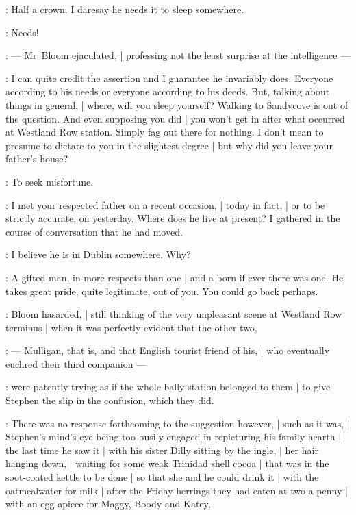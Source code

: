 \Stephen:
Half a crown.
I daresay he needs it to sleep somewhere.

\Bloom:
Needs!

:
    --- Mr~Bloom ejaculated, |
        professing not the least surprise at the intelligence ---

\Bloom:
I can quite credit the assertion and I guarantee he invariably does.
Everyone according to his needs or everyone according to his deeds.
But, talking about things in general, |
where,
will you sleep yourself?
Walking to Sandycove is out of the question.
And even supposing you did |
you won't get in after what occurred at Westland Row station.
Simply fag out there for nothing.
I don't mean to presume to dictate to you in the slightest degree |
but why did you leave your father's house?

\Stephen:
To seek misfortune.

\Bloom:
I met your respected father on a recent occasion, |
today in fact, |
or to be strictly accurate, on yesterday.
Where does he live at present?
I gathered in the course of conversation that he had moved.

\Stephen:
I believe he is in Dublin somewhere.
Why?

\Bloom:
A gifted man,
in more respects than one |
and a born  if ever there was one.
He takes great pride, quite legitimate, out of you.
You could go back perhaps.

:
Bloom hasarded, |
still thinking of the very unpleasant scene at Westland Row terminus |
when it was perfectly evident that the other two,

:
    --- Mulligan, that is, and that English tourist friend of his, |
        who eventually euchred their third companion ---

:
were patently trying as if the whole bally station belonged to them |
to give Stephen the slip in the confusion, which they did.

:
There was no response forthcoming to the suggestion however, |
such as it was, |
Stephen's mind's eye being too busily engaged
in repicturing his family hearth |
the last time he saw it |
with his sister Dilly sitting by the ingle, |
her hair hanging down, |
waiting for some weak Trinidad shell cocoa |
that was in the soot-coated kettle to be done |
so that she and he could drink it |
with the oatmealwater for milk |
after the Friday herrings they had eaten at two a penny |
with an egg apiece for Maggy, Boody and Katey,

